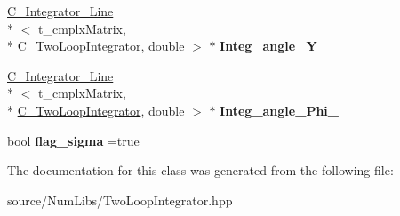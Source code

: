 \begin{DoxyCompactItemize}
\item 
\hypertarget{class_c___two_loop_integrator_a84ff446f27b63602ed5ff948accb27c9}{\hyperlink{class_c___integrator___line}{C\-\_\-\-Integrator\-\_\-\-Line}\\*
$<$ t\-\_\-cmplx\-Matrix, \\*
\hyperlink{class_c___two_loop_integrator}{C\-\_\-\-Two\-Loop\-Integrator}, double $>$ $\ast$ {\bfseries Integ\-\_\-angle\-\_\-\-Y\-\_}}\label{class_c___two_loop_integrator_a84ff446f27b63602ed5ff948accb27c9}

\item 
\hypertarget{class_c___two_loop_integrator_add64b70f12ff90085478a4e702c3db4e}{\hyperlink{class_c___integrator___line}{C\-\_\-\-Integrator\-\_\-\-Line}\\*
$<$ t\-\_\-cmplx\-Matrix, \\*
\hyperlink{class_c___two_loop_integrator}{C\-\_\-\-Two\-Loop\-Integrator}, double $>$ $\ast$ {\bfseries Integ\-\_\-angle\-\_\-\-Phi\-\_}}\label{class_c___two_loop_integrator_add64b70f12ff90085478a4e702c3db4e}

\item 
\hypertarget{class_c___two_loop_integrator_acab6aaf1a7dd9d354a8dce240d1182fb}{bool {\bfseries flag\-\_\-sigma} =true}\label{class_c___two_loop_integrator_acab6aaf1a7dd9d354a8dce240d1182fb}

\end{DoxyCompactItemize}


The documentation for this class was generated from the following file\-:\begin{DoxyCompactItemize}
\item 
source/\-Num\-Libs/Two\-Loop\-Integrator.\-hpp\end{DoxyCompactItemize}
